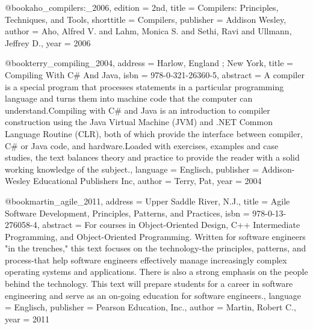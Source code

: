 
@book{aho_compilers:_2006,
  edition    = {2nd},
  title      = {Compilers: {Principles}, {Techniques}, and {Tools}},
  shorttitle = {Compilers},
  publisher  = {Addison Wesley},
  author     = {Aho, Alfred V. and Lahm, Monica S. and Sethi, Ravi and Ullmann, Jeffrey D.},
  year       = {2006}
}

@book{terry_compiling_2004,
  address   = {Harlow, England ; New York},
  title     = {Compiling {With} {C}\# {And} {Java}},
  isbn      = {978-0-321-26360-5},
  abstract  = {A compiler is a special program that processes statements in a particular programming language and turns them into machine code that the computer can understand.Compiling with C\# and Java is an introduction to compiler construction using the Java Virtual Machine (JVM) and .NET Common Language Routine (CLR), both of which provide the interface between compiler, C\# or Java code, and hardware.Loaded with exercises, examples and case studies, the text balances theory and practice to provide the reader with a solid working knowledge of the subject.},
  language  = {Englisch},
  publisher = {Addison-Wesley Educational Publishers Inc},
  author    = {Terry, Pat},
  year      = {2004}
}

@book{martin_agile_2011,
  address   = {Upper Saddle River, N.J.},
  title     = {Agile {Software} {Development}, {Principles}, {Patterns}, and {Practices}},
  isbn      = {978-0-13-276058-4},
  abstract  = {For courses in Object-Oriented Design, C++ Intermediate Programming, and Object-Oriented Programming.  Written for software engineers "in the trenches," this text focuses on the technology-the principles, patterns, and process-that help software engineers effectively manage increasingly complex operating systems and applications. There is also a strong emphasis on the people behind the technology. This text will prepare students for a career in software engineering and serve as an on-going education for software engineers.},
  language  = {Englisch},
  publisher = {Pearson Education, Inc.},
  author    = {Martin, Robert C.},
  year      = {2011}
}

